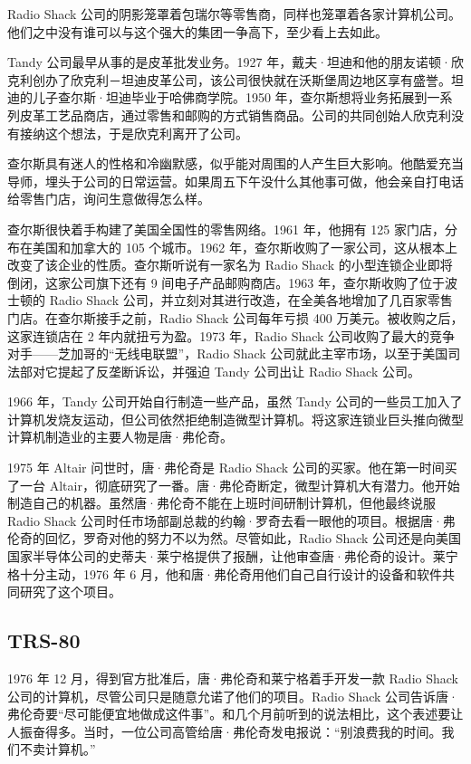 \documentclass[12pt,UTF8]{ctexbook}
\begin{document}
Radio Shack 公司的阴影笼罩着包瑞尔等零售商，同样也笼罩着各家计算机公司。他们之中没有谁可以与这个强大的集团一争高下，至少看上去如此。

Tandy 公司最早从事的是皮革批发业务。1927 年，戴夫·坦迪和他的朋友诺顿·欣克利创办了欣克利－坦迪皮革公司，该公司很快就在沃斯堡周边地区享有盛誉。坦迪的儿子查尔斯·坦迪毕业于哈佛商学院。1950 年，查尔斯想将业务拓展到一系列皮革工艺品商店，通过零售和邮购的方式销售商品。公司的共同创始人欣克利没有接纳这个想法，于是欣克利离开了公司。

查尔斯具有迷人的性格和冷幽默感，似乎能对周围的人产生巨大影响。他酷爱充当导师，埋头于公司的日常运营。如果周五下午没什么其他事可做，他会亲自打电话给零售门店，询问生意做得怎么样。

查尔斯很快着手构建了美国全国性的零售网络。1961 年，他拥有 125 家门店，分布在美国和加拿大的 105 个城市。1962 年，查尔斯收购了一家公司，这从根本上改变了该企业的性质。查尔斯听说有一家名为 Radio Shack 的小型连锁企业即将倒闭，这家公司旗下还有 9 间电子产品邮购商店。1963 年，查尔斯收购了位于波士顿的 Radio Shack 公司，并立刻对其进行改造，在全美各地增加了几百家零售门店。在查尔斯接手之前，Radio Shack 公司每年亏损 400 万美元。被收购之后，这家连锁店在 2 年内就扭亏为盈。1973 年，Radio Shack 公司收购了最大的竞争对手——芝加哥的“无线电联盟”，Radio Shack 公司就此主宰市场，以至于美国司法部对它提起了反垄断诉讼，并强迫 Tandy 公司出让 Radio Shack 公司。

1966 年，Tandy 公司开始自行制造一些产品，虽然 Tandy 公司的一些员工加入了计算机发烧友运动，但公司依然拒绝制造微型计算机。将这家连锁业巨头推向微型计算机制造业的主要人物是唐·弗伦奇。

1975 年 Altair 问世时，唐·弗伦奇是 Radio Shack 公司的买家。他在第一时间买了一台 Altair，彻底研究了一番。唐·弗伦奇断定，微型计算机大有潜力。他开始制造自己的机器。虽然唐·弗伦奇不能在上班时间研制计算机，但他最终说服 Radio Shack 公司时任市场部副总裁的约翰·罗奇去看一眼他的项目。根据唐·弗伦奇的回忆，罗奇对他的努力不以为然。尽管如此，Radio Shack 公司还是向美国国家半导体公司的史蒂夫·莱宁格提供了报酬，让他审查唐·弗伦奇的设计。莱宁格十分主动，1976 年 6 月，他和唐·弗伦奇用他们自己自行设计的设备和软件共同研究了这个项目。





\subsection{TRS-80}


1976 年 12 月，得到官方批准后，唐·弗伦奇和莱宁格着手开发一款 Radio Shack 公司的计算机，尽管公司只是随意允诺了他们的项目。Radio Shack 公司告诉唐·弗伦奇要“尽可能便宜地做成这件事”。和几个月前听到的说法相比，这个表述要让人振奋得多。当时，一位公司高管给唐·弗伦奇发电报说：“别浪费我的时间。我们不卖计算机。”
\end{document}
